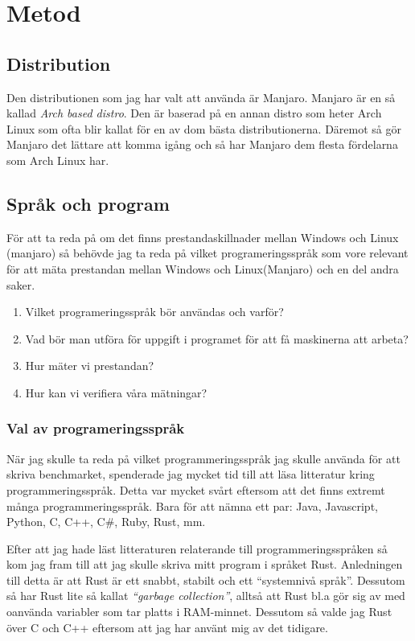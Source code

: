 \documentclass[12pt, a4paper]{report}
\begin{document}
 
\section{Metod}
 
\subsection{Distribution}
Den distributionen som jag har valt att använda är Manjaro\cite{manjaro}. Manjaro är en så kallad \textit{Arch based distro}. Den är baserad på en annan distro som heter Arch Linux som ofta blir kallat för en av dom bästa distributionerna\cite{archIsTheBest}. Däremot så gör Manjaro det lättare att komma igång och så har Manjaro dem flesta fördelarna som Arch Linux har.

\subsection{Språk och program}
 
För att ta reda på om det finns prestandaskillnader mellan Windows och Linux (manjaro) så behövde jag ta reda på vilket programeringsspråk som vore relevant för att mäta prestandan mellan Windows och Linux(Manjaro) och en del andra saker.

\begin{enumerate}
   \item Vilket programeringsspråk bör användas och varför?
   \item Vad bör man utföra för uppgift i programet för att få maskinerna att arbeta?
   \item Hur mäter vi prestandan?
   \item Hur kan vi verifiera våra mätningar?
\end{enumerate}
 

\subsubsection{Val av programeringsspråk}

När jag skulle ta reda på vilket programmeringsspråk jag skulle använda för att skriva benchmarket, spenderade jag mycket tid till att läsa litteratur kring programmeringsspråk. Detta var mycket svårt eftersom att det finns extremt många programmeringsspråk. Bara för att nämna ett par: Java, Javascript, Python, C, C++, C\#, Ruby, Rust, mm. 


Efter att jag hade läst litteraturen relaterande till programmeringsspråken så kom jag fram till att jag skulle skriva mitt program i språket Rust.\cite{rust} Anledningen till detta är att Rust är ett snabbt, stabilt och ett ``systemnivå språk''. Dessutom så har Rust lite så kallat \textit{``garbage collection''}\cite{garbage}, alltså att Rust bl.a gör sig av med oanvända variabler som tar platts i RAM-minnet. Dessutom så valde jag Rust över C och C++ eftersom att jag har använt mig av det tidigare.
\end{document}
